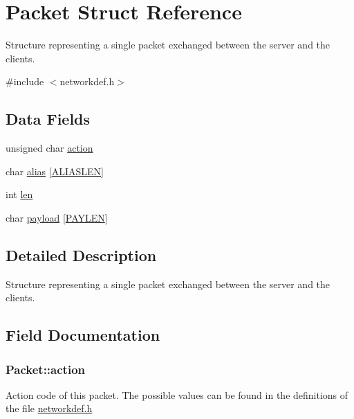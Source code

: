 \hypertarget{structPacket}{}\section{Packet Struct Reference}
\label{structPacket}


Structure representing a single packet exchanged between the server and the clients.  




{\ttfamily \#include $<$networkdef.\+h$>$}

\subsection*{Data Fields}
\begin{DoxyCompactItemize}
\item 
unsigned char \hyperlink{structPacket_a41917e52ffd1d92b7477073cbbceddee}{action}
\item 
char \hyperlink{structPacket_ac20e801b8bbe165a85317fc937d11cf3}{alias} \mbox{[}\hyperlink{networkdef_8h_aa07ba58ae52cf11992b7e112454a3eea}{A\+L\+I\+A\+S\+L\+EN}\mbox{]}
\item 
int \hyperlink{structPacket_a1d26d154760776ebcea98638b0bf1f73}{len}
\item 
char \hyperlink{structPacket_a819db228469a8fd8beb62114dbfaed56}{payload} \mbox{[}\hyperlink{networkdef_8h_a2ec728de0089ed37af934ae60ed1cd7f}{P\+A\+Y\+L\+EN}\mbox{]}
\end{DoxyCompactItemize}


\subsection{Detailed Description}
Structure representing a single packet exchanged between the server and the clients. 

\subsection{Field Documentation}
\subsubsection[{\texorpdfstring{action}{action}}]{\setlength{\rightskip}{0pt plus 5cm}Packet\+::action}\hypertarget{structPacket_a41917e52ffd1d92b7477073cbbceddee}{}\label{structPacket_a41917e52ffd1d92b7477073cbbceddee}
Action code of this packet. The possible values can be found in the definitions of the file {\ttfamily \hyperlink{networkdef_8h}{networkdef.\+h}} 
